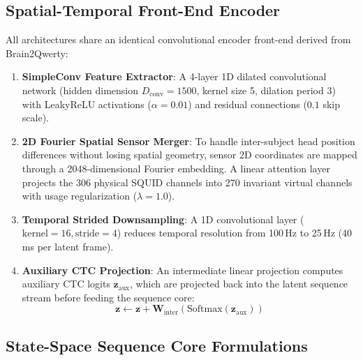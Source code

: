 \documentclass[conference]{IEEEtran}
\begin{document}
\subsection{Spatial-Temporal Front-End Encoder}
All architectures share an identical convolutional encoder front-end derived from Brain2Qwerty:
\begin{enumerate}
    \item \textbf{SimpleConv Feature Extractor}: A 4-layer 1D dilated convolutional network (hidden dimension $D_{\text{conv}} = 1500$, kernel size 5, dilation period 3) with LeakyReLU activations ($\alpha = 0.01$) and residual connections ($0.1$ skip scale).
    \item \textbf{2D Fourier Spatial Sensor Merger}: To handle inter-subject head position differences without losing spatial geometry, sensor 2D coordinates are mapped through a 2048-dimensional Fourier embedding. A linear attention layer projects the 306 physical SQUID channels into 270 invariant virtual channels with usage regularization ($\lambda = 1.0$).
    \item \textbf{Temporal Strided Downsampling}: A 1D convolutional layer ($\text{kernel} = 16, \text{stride} = 4$) reduces temporal resolution from 100\,Hz to 25\,Hz (40\,ms per latent frame).
    \item \textbf{Auxiliary CTC Projection}: An intermediate linear projection computes auxiliary CTC logits $\mathbf{z}_{\text{aux}}$, which are projected back into the latent sequence stream before feeding the sequence core:
    \begin{equation}
        \mathbf{z} \leftarrow \mathbf{z} + \mathbf{W}_{\text{inter}} \left( \text{Softmax}(\mathbf{z}_{\text{aux}}) \right)
    \end{equation}
\end{enumerate}

\subsection{State-Space Sequence Core Formulations}
\end{document}

